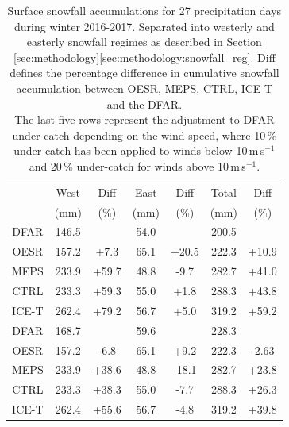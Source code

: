 \documentclass{ametsocV5}
\begin{document}
\begin{table}[t]
	\caption{
		Surface snowfall accumulations for 27 precipitation days during winter 2016-2017. Separated into westerly and easterly snowfall regimes as described in Section \ref{sec:methodology}\ref{sec:methodology:snowfall_reg}. Diff defines the percentage difference in cumulative snowfall accumulation between OESR, MEPS, CTRL, ICE-T and the DFAR.\\
		The last five rows represent the adjustment to DFAR under-catch depending on the wind speed, where 10\,\% under-catch has been applied to winds below 10\,m\,s$^{-1}$ and 20\,\% under-catch for winds above 10\,m\,s$^{-1}$.
	}
	\label{tab:sfc_acc}
	\begin{center}
		\begin{tabular}{c||c|c|c|c|c|c}\hline\hline
			& West & Diff & East & Diff & Total & Diff  \\
			& (mm) & (\%) & (mm) & (\%) & (mm)  & (\%)   \\\hline\hline
			DFAR & 146.5 & & 54.0 & & 200.5 & \\\hline
			OESR & 157.2 & +7.3 & 65.1 & +20.5 & 222.3 & +10.9  \\\hline
			MEPS & 233.9 & +59.7 & 48.8 & -9.7 & 282.7 & +41.0  \\\hline
			CTRL & 233.3 & +59.3 & 55.0 & +1.8 & 288.3 & +43.8  \\\hline
			ICE-T & 262.4 & +79.2 & 56.7 & +5.0 & 319.2 & +59.2  \\\hline\hline
			DFAR & 168.7 & & 59.6 & & 228.3 & \\\hline
			OESR & 157.2 & -6.8 & 65.1 & +9.2 & 222.3 & -2.63  \\\hline
			MEPS & 233.9 & +38.6 & 48.8 & -18.1 & 282.7 & +23.8  \\\hline
			CTRL & 233.3 & +38.3 & 55.0 & -7.7 & 288.3 & +26.3  \\\hline
			ICE-T & 262.4 & +55.6 & 56.7 & -4.8 & 319.2 & +39.8  \\\hline 
			
		\end{tabular}
	\end{center}
\end{table}




\end{document}
